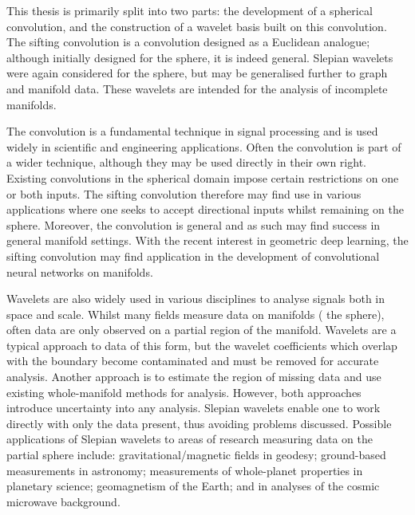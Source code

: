 \begin{impactstatement}
	This thesis is primarily split into two parts: the development of a spherical convolution, and the construction of a wavelet basis built on this convolution.
	The sifting convolution is a convolution designed as a Euclidean analogue; although initially designed for the sphere, it is indeed general.
	Slepian wavelets were again considered for the sphere, but may be generalised further to graph and manifold data.
	These wavelets are intended for the analysis of incomplete manifolds.

	The convolution is a fundamental technique in signal processing and is used widely in scientific and engineering applications.
	Often the convolution is part of a wider technique, although they may be used directly in their own right.
	Existing convolutions in the spherical domain impose certain restrictions on one or both inputs.
	The sifting convolution therefore may find use in various applications where one seeks to accept directional inputs whilst remaining on the sphere.
	Moreover, the convolution is general and as such may find success in general manifold settings.
	With the recent interest in geometric deep learning, the sifting convolution may find application in the development of convolutional neural networks on manifolds.

	Wavelets are also widely used in various disciplines to analyse signals both in space and scale.
	Whilst many fields measure data on manifolds (\ie{} the sphere), often data are only observed on a partial region of the manifold.
	Wavelets are a typical approach to data of this form, but the wavelet coefficients which overlap with the boundary become contaminated and must be removed for accurate analysis.
	Another approach is to estimate the region of missing data and use existing whole-manifold methods for analysis.
	However, both approaches introduce uncertainty into any analysis.
	Slepian wavelets enable one to work directly with only the data present, thus avoiding problems discussed.
	Possible applications of Slepian wavelets to areas of research measuring data on the partial sphere include: gravitational/magnetic fields in geodesy; ground-based measurements in astronomy; measurements of whole-planet properties in planetary science; geomagnetism of the Earth; and in analyses of the cosmic microwave background.
\end{impactstatement}

